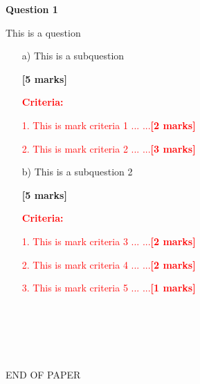 \documentclass[11pt]{article}
\begin{document}
	\pagestyle{fancy}
	\fancyhf{}
	
	\setcounter{page}{1}
	
	
        \textbf{Question 1}

        This is a question
        \begin{enumerate}
            
        \item[a) ]This is a subquestion
        \begin{flushright}
            \textbf{[5 marks]}
        \end{flushright}

        \textcolor{red}{\textbf{Criteria:}}
    
        \setlength{\parindent}{2em}\textcolor{red}{1. This is mark criteria 1 ... ...\textbf{[2 marks]}}
    
        \setlength{\parindent}{2em}\textcolor{red}{2. This is mark criteria 2 ... ...\textbf{[3 marks]}}
    
        \item[b) ]This is a subquestion 2
        \begin{flushright}
            \textbf{[5 marks]}
        \end{flushright}

        \textcolor{red}{\textbf{Criteria:}}
    
        \setlength{\parindent}{2em}\textcolor{red}{1. This is mark criteria 3 ... ...\textbf{[2 marks]}}
    
        \setlength{\parindent}{2em}\textcolor{red}{2. This is mark criteria 4 ... ...\textbf{[2 marks]}}
    
        \setlength{\parindent}{2em}\textcolor{red}{3. This is mark criteria 5 ... ...\textbf{[1 marks]}}
    
        \end{enumerate}
        ~\\
    
	
	
	~\\~\\~\\
	\begin{center}
		END OF PAPER
	\end{center}
	
	
	\label{unknown}
\end{document}
